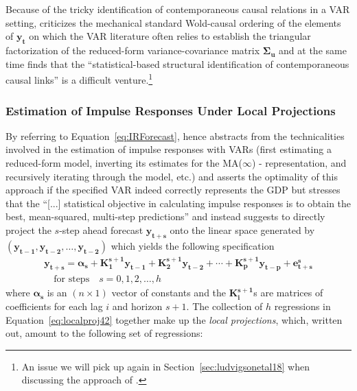 \documentclass[a4paper,11pt,listof=nochaptergap,oneside,pointednumbers,bibtotoc,bigheadings,liststotoc]{scrbook}
\theoremstyle{mysatz}
\theoremstyle{mydefinition}
\theoremstyle{mybemerkung}
\renewcommand*{\paragraph}[1]{\subsubsection*{#1} \vspace{-3mm}} %
\newcommand{\vect}[1]{\boldsymbol{\mathbf{#1}}}
\begin{document}
\\
\\
Because of the tricky identification of contemporaneous causal relations in a VAR setting, \citet{jorda:05} criticizes the mechanical standard Wold-causal ordering of the elements of $\vect{y_t}$ on which the VAR literature often relies to establish the triangular factorization of the reduced-form variance-covariance matrix $\vect{\Sigma_u}$ and at the same time finds that the ``statistical-based structural identification of contemporaneous causal links'' is a difficult venture.\footnote{An issue we will pick up again in Section~\ref{sec:ludvigsonetal18} when discussing the approach of \citet{ludvigsonetal:18}.}

\paragraph{Estimation of Impulse Responses Under Local Projections}
By referring to Equation~\ref{eq:IRForecast}, \citet[p. 4]{jorda:05} hence abstracts from the technicalities involved in the estimation of impulse responses with VARs (first estimating a reduced-form model, inverting its estimates for the MA($\infty$) - representation, and recursively iterating through the model, etc.) and asserts the optimality of this approach if the specified VAR indeed correctly represents the GDP but stresses that the ``[...] statistical objective in calculating impulse responses is to obtain the best, mean-squared, multi-step predictions'' and instead suggests to directly project the $s$-step ahead forecast $\vect{y_{t+s}}$ onto the linear space generated by $(\vect{y_{t-1}}, \vect{y_{t-2}}, \dots, \vect{y_{t-2}})$ which yields the following specification
\begin{equation} \label{eq:localproj42}
\begin{split}
	\vect{y_{t+s}} = \vect{\alpha_s} + \vect{K_1^{s+1}}\vect{y_{t-1}} + \vect{K_2^{s+1}}\vect{y_{t-2}} + \cdots + \vect{K_p^{s+1}}\vect{y_{t-p}} + \vect{e_{t+s}^s} \\
	\quad \text{for steps} \quad s=0, 1, 2, \dots, h 
\end{split}								
\end{equation}
where $\vect{\alpha_s}$ is an $(n \times 1)$ vector of constants and the $\vect{K_i^{s+1}}$s are matrices of coefficients for each lag $i$ and horizon $s+1$. The collection of $h$ regressions in Equation~\ref{eq:localproj42} together make up the \textit{local projections}, which, written out, amount to the following set of regressions:
\end{document}
